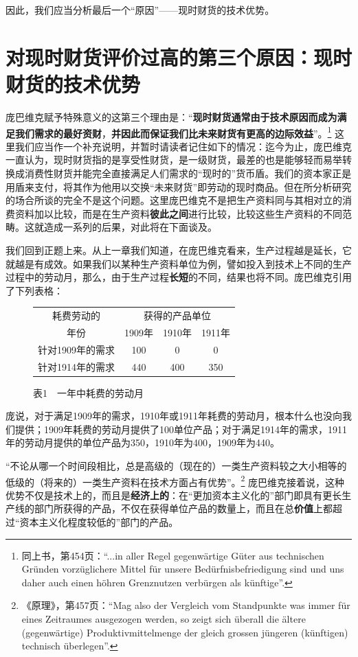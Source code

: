 \documentclass[fontset=fandol, a4paper, 12pt, openright]{ctexbook}
\begin{document}
因此，我们应当分析最后一个“原因”——现时财货的技术优势。

\section{对现时财货评价过高的第三个原因：现时财货的技术优势}

庞巴维克赋予特殊意义的这第三个理由是：“\textbf{现时财货通常由于技术原因而成为满足我们需求的最好资财}，\textbf{并因此而保证我们比未来财货有更高的边际效益}”。\footnote{同上书，第454页：“...in aller Regel gegenw\"{a}rtige G\"{u}ter aus technischen Gr\"{u}nden vorz\"{u}glichere Mittel f\"{u}r unsere Bed\"{u}rfnisbefriedigung sind und uns daher auch einen h\"{o}hren Grenznutzen verb\"{u}rgen als k\"{u}nftige”.} 这里我们应当作一个补充说明，并暂时请读者记住如下的情况：迄今为止，庞巴维克一直认为，现时财货指的是享受性财货，是一级财货，最差的也是能够轻而易举转换成消费性财货并能完全直接满足人们需求的“现时的”货币盾。我们的资本家正是用盾来支付，将其作为他用以交换“未来财货”即劳动的现时商品。但在所分析研究的场合所谈的完全不是这个问题。这里庞巴维克不是把生产资料同与其相对立的消费资料加以比较，而是在生产资料\textbf{彼此之间}进行比较，比较这些生产资料的不同范畴。这就造成一系列的后果，对此将在下面谈及。

我们回到正题上来。从上一章我们知道，在庞巴维克看来，生产过程越是延长，它就越是有成效。如果我们以某种生产资料单位为例，譬如投入到技术上不同的生产过程中的劳动月，那么，由于生产过程\textbf{长短}的不同，结果也将不同。庞巴维克引用了下列表格：

\begin{figure}[htbp]
    \centering
    \begin{tabular}{c c c c}
        \hline
        耗费劳动的 & \multicolumn{3}{c}{获得的产品单位} \\
        年份 & 1909年 & 1910年 & 1911年 \\
        \hline
        针对1909年的需求 & 100 & 0 & 0 \\
        针对1914年的需求 & 440 & 400 & 350 \\
        \hline
    \end{tabular}
    \caption{表1　一年中耗费的劳动月}
\end{figure}

庞说，对于满足1909年的需求，1910年或1911年耗费的劳动月，根本什么也没向我们提供；1909年耗费的劳动月提供了100单位产品；对于满足1914年的需求，1911年的劳动月提供的单位产品为350，1910年为400，1909年为440。

“不论从哪一个时间段相比，总是高级的（现在的）一类生产资料较之大小相等的低级的（将来的）一类生产资料在技术方面占有优势”。\footnote{《原理》，第457页：“Mag also der Vergleich vom Standpunkte was immer f\"{u}r eines Zeitraumes ausgezogen werden, so zeigt sich \"{u}berall die \"{a}ltere (gegenw\"{a}rtige) Produktivmittelmenge der gleich grossen j\"{u}ngeren (k\"{u}nftigen) technisch \"{u}berlegen”.} 庞巴维克接着说，这种优势不仅是技术上的，而且是\textbf{经济上的}：在“更加资本主义化的”部门即具有更长生产线的部门所获得的产品，不仅在获得单位产品的数量上，而且在总\textbf{价值}上都超过“资本主义化程度较低的”部门的产品。
\end{document}
